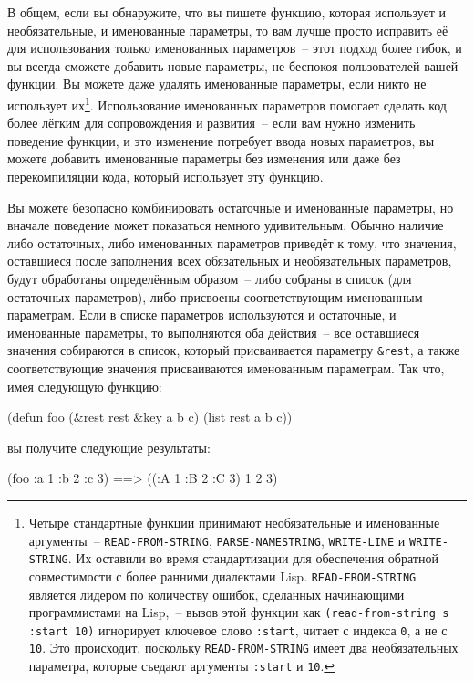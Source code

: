 В общем, если вы обнаружите, что вы пишете функцию, которая использует и необязательные, и
именованные параметры, то вам лучше просто исправить её для использования только
именованных параметров~-- этот подход более гибок, и вы всегда сможете добавить новые
параметры, не беспокоя пользователей вашей функции.  Вы можете даже удалять именованные
параметры, если никто не использует их\footnote{Четыре стандартные функции принимают
  необязательные и именованные аргументы~-- \lstinline{READ-FROM-STRING},
  \lstinline{PARSE-NAMESTRING}, \lstinline{WRITE-LINE} и \lstinline{WRITE-STRING}.  Их оставили во время
  стандартизации для обеспечения обратной совместимости с более ранними диалектами Lisp.
  \lstinline{READ-FROM-STRING} является лидером по количеству ошибок, сделанных начинающими
  программистами на Lisp,~-- вызов этой функции как \lstinline{(read-from-string s :start 10)}
  игнорирует ключевое слово \lstinline{:start}, читает с индекса \lstinline{0}, а не с \lstinline{10}.
  Это происходит, поскольку \lstinline{READ-FROM-STRING} имеет два необязательных параметра,
  которые съедают аргументы \lstinline{:start} и \lstinline{10}.}.  Использование именованных
параметров помогает сделать код более лёгким для сопровождения и развития~-- если вам
нужно изменить поведение функции, и это изменение потребует ввода новых параметров, вы
можете добавить именованные параметры без изменения или даже без перекомпиляции кода,
который использует эту функцию.

Вы можете безопасно комбинировать остаточные и именованные параметры, но вначале поведение
может показаться немного удивительным.  Обычно наличие либо остаточных, либо именованных
параметров приведёт к тому, что значения, оставшиеся после заполнения всех обязательных и
необязательных параметров, будут обработаны определённым образом~-- либо собраны в список
(для остаточных параметров), либо присвоены соответствующим именованным параметрам. Если в
списке параметров используются и остаточные, и именованные параметры, то выполняются оба
действия~-- все оставшиеся значения собираются в список, который присваивается параметру
\lstinline!&rest!, а также соответствующие значения присваиваются именованным параметрам.
Так что, имея следующую функцию:

\begin{myverb}
(defun foo (&rest rest &key a b c) 
  (list rest a b c))
\end{myverb}

\noindent{}вы получите следующие результаты:

\begin{myverb}
(foo :a 1 :b 2 :c 3)  ==> ((:A 1 :B 2 :C 3) 1 2 3)
\end{myverb}

